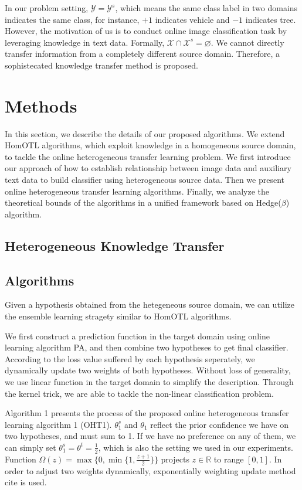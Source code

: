 \documentclass[letterpaper]{article}
\begin{document}
In our problem setting, $\mathcal{Y} = \mathcal{Y}^{s}$, which means the same class label in two domains indicates the same class, for instance, $+1$ indicates vehicle and $-1$ indicates tree.
However, the motivation of us is to conduct online image classification task by leveraging knowledge in text data.
Formally, $\mathcal{X} \cap \mathcal{X}^{s} = \varnothing$.
We cannot directly transfer information from a completely different source domain.
Therefore, a sophistecated knowledge transfer method is proposed.

\section{Methods}

In this section, we describe the details of our proposed algorithms.
We extend HomOTL algorithms, which exploit knowledge in a homogeneous source domain, to tackle the online heterogeneous transfer learning problem.
We first introduce our approach of how to establish relationship between image data and auxiliary text data to build classifier using heterogeneous source data.
Then we present online heterogeneous transfer learning algorithms.
Finally, we analyze the theoretical bounds of the algorithms in a unified framework based on Hedge($\beta$) algorithm.

\subsection{Heterogeneous Knowledge Transfer}

\subsection{Algorithms}

Given a hypothesis obtained from the hetegeneous source domain, we can utilize the ensemble learning stragety similar to HomOTL algorithms.

We first construct a prediction function in the target domain using online learning algorithm PA, and then combine two hypotheses to get final classifier.
According to the loss value suffered by each hypothesis seperately, we dynamically update two weights of both hypotheses.
Without loss of generality, we use linear function in the target domain to simplify the description.
Through the kernel trick, we are able to tackle the non-linear classification problem.

Algorithm 1 presents the process of the proposed online heterogeneous transfer learning algorithm 1 (OHT1).
$\theta_{1}^{s}$ and $\theta_1$ reflect the prior confidence we have on two hypotheses, and must sum to 1.
If we have no preference on any of them, we can simply set $\theta_{1}^{s} = \theta^{t} = \frac{1}{2}$, which is also the setting we used in our experiments.
Function $\varOmega(z) = \max \{ 0, \min \{ 1, \frac{z+1}{2} \}\}$ projects $z \in \mathbb{R}$ to range $[0,1]$.
In order to adjust two weights dynamically, exponentially weighting update method cite is used.
\end{document}
